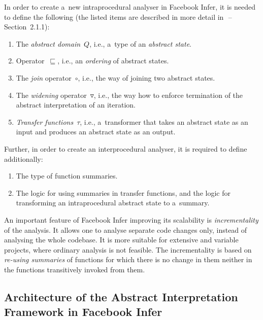 In order to create a~new intraprocedural analyser in Facebook Infer,
it is needed to define the following (the listed items are described in more
detail in~\cite{harmimBP}\,--\,Section~2.1.1):
\begin{enumerate}
    \item
        The \emph{abstract domain}~$ Q $, i.e., a~type of an \emph{abstract
        state}.

    \item
        Operator~$ \sqsubseteq $, i.e., an \emph{ordering} of abstract states.

    \item
        The \emph{join} operator~$ \circ $, i.e., the way of joining two
        abstract states.

    \item
        The \emph{widening} operator~$ \triangledown $, i.e., the way how to
        enforce termination of the abstract interpretation of an iteration.

    \item
        \emph{Transfer functions}~$ \tau $, i.e., a~transformer that takes an
        abstract state as an input and produces an abstract state as an output.
\end{enumerate}
Further, in order to create an interprocedural analyser, it is required to
define additionally:
\begin{enumerate}
    \item
        The type of function summaries.

    \item
        The logic for using summaries in transfer functions, and the logic for
        transforming an intraprocedural abstract state to a~summary.
\end{enumerate}

An important feature of Facebook Infer improving its scalability is
\emph{incrementality} of the analysis. It allows one to analyse separate code
changes only, instead of analysing the whole codebase. It is more suitable for
extensive and variable projects, where ordinary analysis is not feasible. The
incrementality is based on \emph{re-using summaries} of functions for which
there is no change in them neither in the functions transitively invoked from
them.

\subsection{\sloppy%
    Architecture of the Abstract Interpretation Framework in Facebook Infer%
}
\label{sec:fbinferArch}

